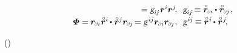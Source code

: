 \begin{equation*}
\begin{array}{r@{\hspace{.66em}}l}
= \textsl{g}_{i\hspace{-0.1ex}j} \hspace{.1ex} \currentlocationvector^{i} \currentlocationvector^{j}
\hspace{-0.3ex} , &
\textsl{g}_{i\hspace{-0.1ex}j} \hspace{-0.15ex} \equiv
\initiallocationvector_\differentialindex{i} \hspace{-0.1ex} \dotp \hspace{.1ex} \initiallocationvector_\differentialindex{\hspace{-0.1ex}j}
\hspace{.1ex} ,
\\[.25em]
%
\mathboldPhi = \hspace{-0.1ex} \currentlocationvector_\differentialindex{i} \hspace{.1ex} \initiallocationvector^i \hspace{-0.15ex} \dotp \hspace{.1ex} \initiallocationvector^j \currentlocationvector_\differentialindex{\hspace{-0.1ex}j} \hspace{-0.2ex}
= \textsl{g}^{\hspace{.2ex}i\hspace{-0.1ex}j} \currentlocationvector_\differentialindex{i} \currentlocationvector_\differentialindex{\hspace{-0.1ex}j}
\hspace{.1ex} , &
\textsl{g}^{\hspace{.2ex}i\hspace{-0.1ex}j} \hspace{-0.15ex} \equiv
\initiallocationvector^{\hspace{.1ex}i} \hspace{-0.15ex} \dotp \hspace{.1ex} \initiallocationvector^{\hspace{.1ex}j}
\hspace{-0.3ex} ,
\end{array}
\end{equation*}

\vspace{-0.2em}\noindent
{}
~()

